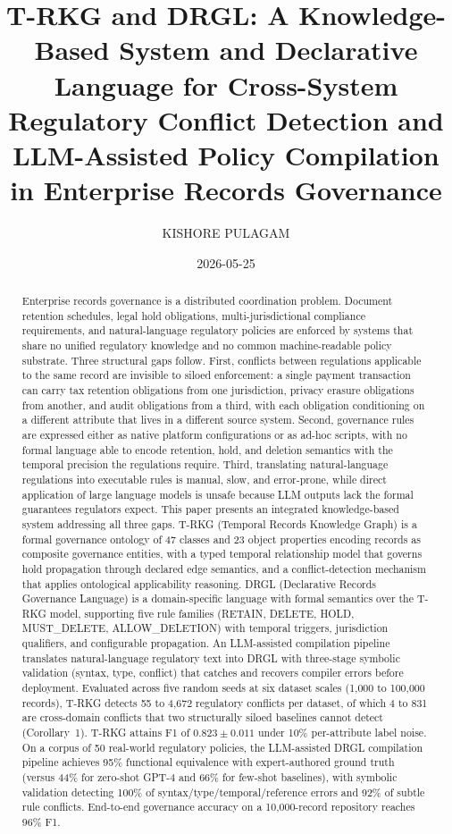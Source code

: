 \documentclass{ieeeaccess}
\title{T-RKG and DRGL: A Knowledge-Based System and Declarative Language for Cross-System Regulatory Conflict Detection and LLM-Assisted Policy Compilation in Enterprise Records Governance}
\author{\uppercase{Kishore Pulagam}\authorrefmark{1}\orcid{0009-0006-7929-8699}}
\date{2026-05-25}
\begin{document}
\maketitle

\begin{abstract}
Enterprise records governance is a distributed coordination problem. Document retention schedules, legal hold obligations, multi-jurisdictional compliance requirements, and natural-language regulatory policies are enforced by systems that share no unified regulatory knowledge and no common machine-readable policy substrate. Three structural gaps follow. First, conflicts between regulations applicable to the same record are invisible to siloed enforcement: a single payment transaction can carry tax retention obligations from one jurisdiction, privacy erasure obligations from another, and audit obligations from a third, with each obligation conditioning on a different attribute that lives in a different source system. Second, governance rules are expressed either as native platform configurations or as ad-hoc scripts, with no formal language able to encode retention, hold, and deletion semantics with the temporal precision the regulations require. Third, translating natural-language regulations into executable rules is manual, slow, and error-prone, while direct application of large language models is unsafe because LLM outputs lack the formal guarantees regulators expect. This paper presents an integrated knowledge-based system addressing all three gaps. T-RKG (Temporal Records Knowledge Graph) is a formal governance ontology of 47 classes and 23 object properties encoding records as composite governance entities, with a typed temporal relationship model that governs hold propagation through declared edge semantics, and a conflict-detection mechanism that applies ontological applicability reasoning. DRGL (Declarative Records Governance Language) is a domain-specific language with formal semantics over the T-RKG model, supporting five rule families (RETAIN, DELETE, HOLD, MUST\_DELETE, ALLOW\_DELETION) with temporal triggers, jurisdiction qualifiers, and configurable propagation. An LLM-assisted compilation pipeline translates natural-language regulatory text into DRGL with three-stage symbolic validation (syntax, type, conflict) that catches and recovers compiler errors before deployment. Evaluated across five random seeds at six dataset scales (1{,}000 to 100{,}000 records), T-RKG detects 55 to 4{,}672 regulatory conflicts per dataset, of which 4 to 831 are cross-domain conflicts that two structurally siloed baselines cannot detect (Corollary~1). T-RKG attains F1 of $0.823 \pm 0.011$ under 10\% per-attribute label noise. On a corpus of 50 real-world regulatory policies, the LLM-assisted DRGL compilation pipeline achieves 95\% functional equivalence with expert-authored ground truth (versus 44\% for zero-shot GPT-4 and 66\% for few-shot baselines), with symbolic validation detecting 100\% of syntax/type/temporal/reference errors and 92\% of subtle rule conflicts. End-to-end governance accuracy on a 10{,}000-record repository reaches 96\% F1.
\end{abstract}
\end{document}
